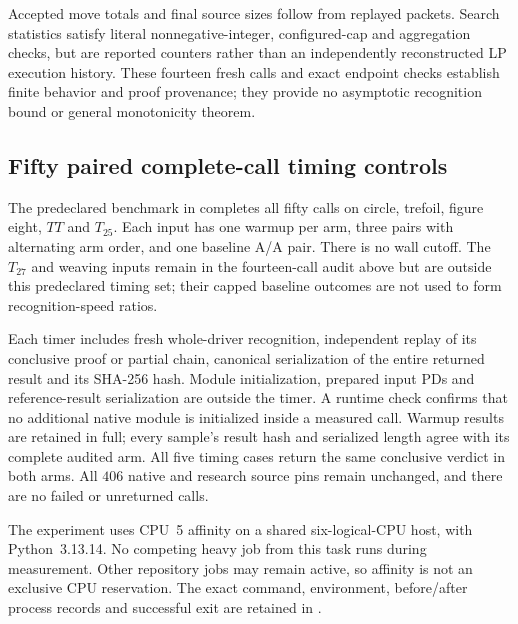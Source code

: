 Accepted move totals and final source sizes follow from replayed
packets.  Search statistics satisfy literal nonnegative-integer,
configured-cap and aggregation checks, but are reported counters rather
than an independently reconstructed LP execution history.  These
fourteen fresh calls and exact endpoint checks establish finite
behavior and proof provenance; they provide no asymptotic recognition
bound or general monotonicity theorem.

\subsection{Fifty paired complete-call timing controls}
\label{sec:pachner-descent-crushing-timing}

The predeclared benchmark in
 completes all fifty calls
on circle, trefoil, figure eight, $TT$ and $T_{25}$.  Each input has
one warmup per arm, three pairs with alternating arm order, and one
baseline A/A pair.  There is no wall cutoff.  The $T_{27}$ and weaving
inputs remain in the fourteen-call audit above but are outside this
predeclared timing set; their capped baseline outcomes are not used
to form recognition-speed ratios.

Each timer includes fresh whole-driver recognition, independent replay
of its conclusive proof or partial chain, canonical serialization of
the entire returned result and its SHA-256 hash.  Module initialization,
prepared input PDs and reference-result serialization are outside the
timer.  A runtime check confirms that no additional native module is
initialized inside a measured call.  Warmup results are retained in
full; every sample's result hash and serialized length agree with its
complete audited arm.  All five timing cases return the same conclusive
verdict in both arms.  All $406$ native and research source pins remain
unchanged, and there are no failed or unreturned calls.

The experiment uses CPU~5 affinity on a shared six-logical-CPU host,
with Python~3.13.14.  No competing heavy job from this task runs during
measurement.  Other repository jobs may remain active, so affinity is
not an exclusive CPU reservation.  The exact command, environment,
before/after process records and successful exit are retained in
.

